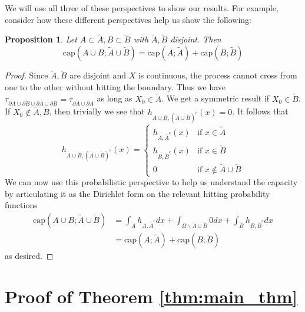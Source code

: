 \documentclass[english, aip, jcp, priprint, graphicx,floatfix]{revtex4-1}
\newtheorem{proposition}{Proposition}
\theoremstyle{plain}
\theoremstyle{definition}
\theoremstyle{plain}
\newcommand{\capac}[2]{\mathrm{cap}\left(#1;#2\right)}
\begin{document}
  We will use all three of these perspectives to show our results.  For example, consider how these different perspectives help us show the following:

\begin{proposition}\label{prop:capacity}
Let $A\subset \tilde A,B\subset \tilde B$ with $\tilde A,\tilde B$ disjoint.  Then 
\[
\capac{A\cup B}{\tilde A \cup \tilde B}=\capac{A}{\tilde A}+\capac{B}{\tilde B}
\]
\end{proposition}
\begin{proof}
Since $\tilde A,\tilde B$ are disjoint and $X$ is continuous, the process cannot cross from one to the other without hitting the boundary.  Thus we have $\tau_{\partial \tilde A\cup \partial \tilde B \cup \partial A \cup \partial B}=\tau_{\partial \tilde A \cup \partial A}$ as long as $X_0\in\tilde A$.  We get a symmetric result if $X_0\in \tilde B$.  If $X_0\notin \tilde A,\tilde B$, then trivially we see that $h_{A\cup B,(\tilde A \cup \tilde B)^c}(x)=0$.  It follows that
\[
h_{A\cup B,(\tilde A\cup\tilde B)^c}(x) = 
    \begin{cases}
    h_{A,\tilde A^c}(x) & \mbox{if }x\in \tilde A\\
    h_{B,\tilde B^c}(x) & \mbox{if }x\in \tilde B\\
    0 & \mbox{if }x\notin \tilde A\cup\tilde B
    \end{cases}
\]
We can now use this probabilistic perspective to help us understand the capacity by articulating it as the Dirichlet form on the relevant hitting probability functions
\begin{align*}
\capac{A\cup B}{\tilde A \cup \tilde B} &= 
        \int_{\tilde A} h_{A,\tilde A^c}dx
        +\int_{\Omega\backslash \tilde A \cup \tilde B} 0 dx  
        +\int_{\tilde B} h_{B,\tilde B^c}dx \\
        &= \capac{A}{\tilde A}+\capac{B}{\tilde B}
\end{align*}
as desired.
\end{proof}


                                                       


\section{Proof of Theorem \ref{thm:main_thm}}\label{sec:proof_thm}
\end{document}
